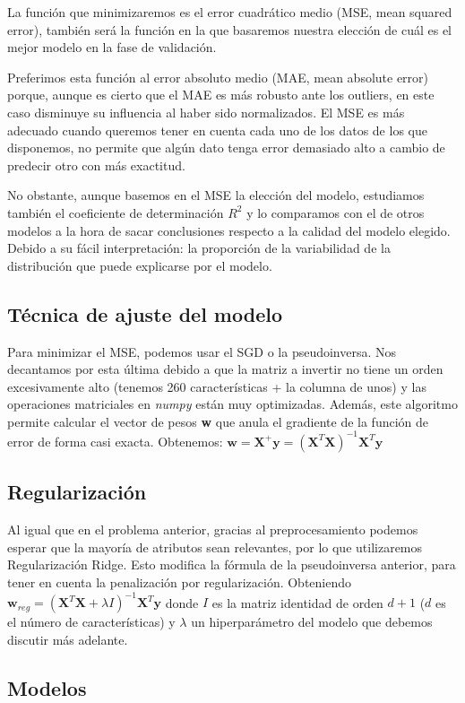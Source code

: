 \documentclass[a4]{article}
\begin{document}
La función que minimizaremos es el error cuadrático medio (MSE, mean
squared error), también será la función en la que basaremos nuestra
elección de cuál es el mejor modelo en la fase de validación.

Preferimos esta función al error absoluto medio (MAE, mean absolute
error) porque, aunque es cierto que el MAE es más robusto ante los
outliers, en este caso disminuye su influencia al haber sido
normalizados. El MSE es más adecuado cuando queremos tener en cuenta
cada uno de los datos de los que disponemos, no permite que algún dato
tenga error demasiado alto a cambio de predecir otro con más exactitud.

No obstante, aunque basemos en el MSE la elección del modelo,
estudiamos también el coeficiente de determinación $R^2$ y lo
comparamos con el de otros modelos a la hora de sacar conclusiones
respecto a la calidad del modelo elegido. Debido a su fácil
interpretación: la proporción de la variabilidad de la distribución
que puede explicarse por el modelo.

\subsection{Técnica de ajuste del modelo}

Para minimizar el MSE, podemos usar el SGD o la pseudoinversa. Nos
decantamos por esta última debido a que la matriz a invertir no tiene
un orden excesivamente alto (tenemos 260 características + la columna
de unos) y las operaciones matriciales en \textit{numpy} están muy
optimizadas. Además, este algoritmo permite calcular el vector de
pesos \textbf{w} que anula el gradiente de la función de error de
forma casi exacta. Obtenemos:
$\textbf{w}=\textbf{X}^+ \textbf{y}=(\textbf{X}^T
\textbf{X})^{-1}\textbf{X}^T \textbf{y}$

\subsection{Regularización}

Al igual que en el problema anterior, gracias al preprocesamiento
podemos esperar que la mayoría de atributos sean relevantes, por lo
que utilizaremos Regularización Ridge. Esto modifica la fórmula de la
pseudoinversa anterior, para tener en cuenta la penalización por
regularización. Obteniendo
$\textbf{w}_{reg}=(\textbf{X}^T \textbf{X}+\lambda I)^{-1}\textbf{X}^T
\textbf{y}$ donde $I$ es la matriz identidad de orden $d+1$ ($d$ es el
número de características) y $\lambda$ un hiperparámetro del modelo
que debemos discutir más adelante.

\subsection{Modelos}
\end{document}
